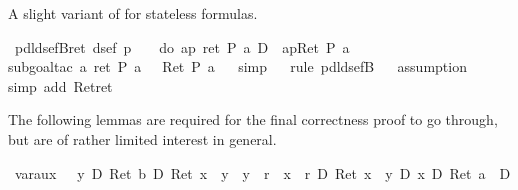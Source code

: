 \begin{isabellebody}
%
\begin{isamarkuptext}%
A slight variant of  for stateless formulas.%
\end{isamarkuptext}%
\isamarkuptrue%
\ pdl{\isacharunderscore}dsefB{\isacharunderscore}ret{\isacharcolon}\ {\isachardoublequote}dsef\ p\ {\isasymLongrightarrow}\ {\isasymturnstile}\ {\isasymUp}\ {\isacharparenleft}do\ {\isacharbraceleft}a{\isasymleftarrow}p{\isacharsemicolon}\ ret\ {\isacharparenleft}P\ a{\isacharparenright}{\isacharbraceright}{\isacharparenright}\ {\isasymlongleftrightarrow}\isactrlsub D\ {\isacharbrackleft}{\isacharhash}\ a{\isasymleftarrow}p{\isacharbrackright}{\isacharparenleft}Ret\ {\isacharparenleft}P\ a{\isacharparenright}{\isacharparenright}{\isachardoublequote}\isanewline
\ \ \isamarkupfalse%
subgoal{\isacharunderscore}tac\ {\isachardoublequote}{\isasymforall}a{\isachardot}\ ret\ {\isacharparenleft}P\ a{\isacharparenright}\ {\isacharequal}\ {\isasymDown}\ Ret\ {\isacharparenleft}P\ a{\isacharparenright}{\isachardoublequote}{\isacharparenright}\isanewline
\ \ \isamarkupfalse%
simp{\isacharparenright}\isanewline
\ \ \isamarkupfalse%
rule\ pdl{\isacharunderscore}dsefB{\isacharparenright}\isanewline
\ \ \isamarkupfalse%
assumption{\isacharparenright}\isanewline
\ \ \isamarkupfalse%
simp\ add{\isacharcolon}\ Ret{\isacharunderscore}ret{\isacharparenright}\isanewline
\isamarkupfalse%
\isamarkupfalse%
%
\isamarkuptrue%
%
\begin{isamarkuptext}%
The following lemmas are required for the final correctness proof to go through, but
  are of rather limited interest in general.%
\end{isamarkuptext}%
\isamarkuptrue%
\ var{\isacharunderscore}aux{}{\isacharcolon}\ {\isachardoublequote}{\isasymturnstile}\ {\isacharparenleft}\ {\isacharasterisk}y\ {\isacharequal}\isactrlsub D\ Ret\ b\ {\isasymand}\isactrlsub D\ Ret\ {\isacharparenleft}x\ {\isasymnoteq}\ y\ {\isasymand}\ y\ {\isasymnoteq}\ r\ {\isasymand}\ x\ {\isasymnoteq}\ r{\isacharparenright}\ {\isasymand}\isactrlsub D\ {\isacharparenleft}Ret\ {\isacharparenleft}x\ {\isasymnoteq}\ y{\isacharparenright}\ {\isasymlongrightarrow}\isactrlsub D\ {\isacharasterisk}x\ {\isacharequal}\isactrlsub D\ Ret\ a{\isacharparenright}\ {\isacharparenright}\ {\isasymlongrightarrow}\isactrlsub D\isanewline

\end{isabellebody}
